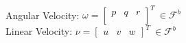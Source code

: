 \documentclass[a4paper, 11pt, oneside, openright, parskip=full]{book}
\begin{document}
\\
Angular Velocity: $\omega=\begin{bmatrix}
p & q & r\\
\end{bmatrix}^T~\in\mathcal{F}^b$
\\
Linear Velocity: $\nu=\begin{bmatrix}
u & v & w
\end{bmatrix}^T~\in\mathcal{F}^b$
\tableofcontents

\listoffigures

\listoftables



\mainmatter











\backmatter





\end{document}
